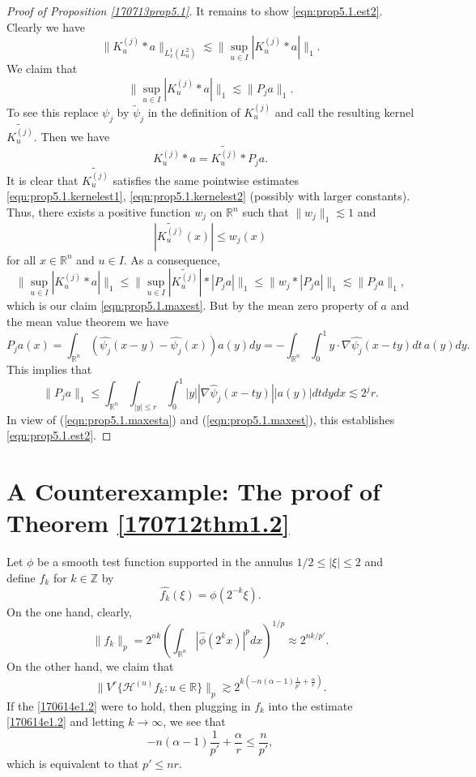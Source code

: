 \documentclass[12pt,leqno]{amsart}
\def\R{\mathbb{R}}
\def\Z{\mathbb{Z}}
\theoremstyle{plain}
\numberwithin{equation}{section}
\begin{document}
\begin{proof}[Proof of Proposition \ref{170713prop5.1}]
It remains to show \eqref{eqn:prop5.1.est2}. Clearly we have 
\begin{equation}\label{eqn:prop5.1.maxesta} 
\| K_u^{(j)} * a\|_{L^1_x(L^2_u)} \lesssim \|\sup_{u\in I} |K_u^{(j)}*a| \|_1.
\end{equation}
We claim that
\begin{equation}\label{eqn:prop5.1.maxest}
\|\sup_{u\in I} |K_u^{(j)}*a| \|_1 \lesssim \|P_j a\|_1.
\end{equation}
To see this replace $\psi_j$ by $\widetilde{\psi}_j$ in the definition of $K_u^{(j)}$ and call the resulting kernel $\widetilde{K_u^{(j)}}$. Then we have
\[ K_u^{(j)}*a = \widetilde{K_u^{(j)}}*P_j a.\]
It is clear that $\widetilde{K_u^{(j)}}$ satisfies the same pointwise estimates \eqref{eqn:prop5.1.kernelest1}, \eqref{eqn:prop5.1.kernelest2} (possibly with larger constants). Thus, there exists a positive function $w_j$ on $\R^n$ such that $\|w_j\|_1\lesssim 1$ and
\[ |\widetilde{K_u^{(j)}}(x)| \le w_j(x) \]
for all $x\in\R^n$ and $u\in I$.
As a consequence,
\[ \|\sup_{u\in I} |K_u^{(j)}*a| \|_1\le \|\sup_{u\in I} |\widetilde{K_u^{(j)}}|*|P_j a| \|_1 \le \|w_j * |P_j a|\|_1\lesssim \|P_j a\|_1,  \]
which is our claim \eqref{eqn:prop5.1.maxest}.
But by the mean zero property of $a$ and the mean value theorem we have
\[ P_j a (x) = \int_{\R^n} (\widehat{\psi_j}(x-y)-\widehat{\psi_j}(x)) a(y) dy = -\int_{\R^n} \int_0^1 y\cdot \nabla \widehat{\psi_j} (x-ty) dt \, a(y) dy.\]
This implies that
\[ \|P_j a\|_1 \le \int_{\R^n} \int_{|y|\le r} \int_0^1 |y| |\nabla \widehat{\psi}_j(x-ty)| |a(y)| dt dy dx\lesssim 2^j r.\]
In view of (\ref{eqn:prop5.1.maxesta}) and (\ref{eqn:prop5.1.maxest}), this establishes \eqref{eqn:prop5.1.est2}.



\end{proof}




\section{A Counterexample: The proof of Theorem \ref{170712thm1.2}}\label{section:counter}

Let $\phi$ be a smooth test function supported in the annulus $1/2\le |\xi|\le 2$ and define $f_k$ for $k\in\Z$ by \[\widehat{f_k}(\xi) = \phi(2^{-k} \xi).\]
On the one hand, clearly,
\[ \|f_k\|_p = 2^{nk} \left(\int_{\mathbb{R}^n} |\widehat{\phi}(2^k x)|^p dx\right)^{1/p}\approx 2^{nk/p'}.\]
On the other hand, we claim that
\begin{equation}\label{eqn:vrnormclaimgen}
\|V^r \{ \mathcal{H}^{(u)} f_k \colon u \in \mathbb{R}\} \|_p \gtrsim 2^{k(-n(\alpha-1)\frac1{p'} +\frac\alpha r)}.
\end{equation}
If the \eqref{170614e1.2} were to hold, then plugging in $f_k$ into the estimate \eqref{170614e1.2} and letting $k\to\infty$, we see that
\[ -n(\alpha-1)\frac1{p'} +\frac\alpha r\le \frac{n}{p'},
\]
which is equivalent to that $p'\le nr$.
\end{document}
